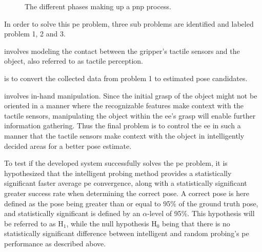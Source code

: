 \begin{figure}[h]
\begin{center}
\begin{minipage}[t]{.24\linewidth}
			\captionsetup{type=figure}
			\label{fig:grasping-phase}
		\end{minipage}%
		\begin{minipage}[t]{.24\linewidth}
			\vspace{0pt}
			\captionsetup{type=figure}
			\label{fig:transportation-phase}
		\end{minipage}%
		\hfill%
		\begin{minipage}[t]{.24\linewidth}
			\vspace{0pt}
			\captionsetup{type=figure}
			\label{fig:placement-phase}
		\end{minipage}%
	\end{center}
	\caption{The different phases making up a \gls{pnp} process.}
	\label{fig:pnp-pipeline}
\end{figure}

In order to solve this \gls{pe} problem, three sub problems are identified and labeled problem 1, 2 and 3.
\begin{problem} \label{prob:1}
	\normalfont involves modeling the contact between the gripper's tactile sensors and the object, also referred to as tactile perception. 
\end{problem}

\begin{problem} \label{prob:2}
	\normalfont is to convert the collected data from problem 1 to estimated pose candidates.
\end{problem}

\begin{problem} \label{prob:3}
	\normalfont involves in-hand manipulation. Since the initial grasp of the object might not be oriented in a manner where the recognizable features make context with the tactile sensors, manipulating the object within the \gls{ee}'s grasp will enable further information gathering. Thus the final problem is to control the \gls{ee} in such a manner that the tactile sensors make context with the object in intelligently decided areas for a better pose estimate.
\end{problem}

To test if the developed system successfully solves the \gls{pe} problem, it is hypothesized that the intelligent probing method provides a statistically significant faster average \gls{pe} convergence, along with a statistically significant greater success rate when determining the correct pose. A correct pose is here defined as the pose being greater than or equal to 95\% of the ground truth pose, and statistically significant is defined by an $\alpha$-level of 95\%. This hypothesis will be referred to as $\text{H}_1$, while the null hypothesis $\text{H}_0$ being that there is no statistically significant difference between intelligent and random probing's \gls{pe} performance as described above.

